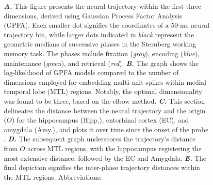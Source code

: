 \documentclass[final,3p,times,twocolumn]{elsarticle}
\begin{document}
\begin{figure}[ht]
{\textbf{\textit{A.}} This figure presents the neural trajectory within the first three dimensions, derived using Gaussian Process Factor Analysis (GPFA). Each smaller dot signifies the coordinates of a 50-ms neural trajectory bin, while larger dots indicated in \textit{black} represent the geometric medians of successive phases in the Sternberg working memory task. The phases include fixation (\textit{gray}), encoding (\textit{blue}), maintenance (\textit{green}), and retrieval (\textit{red})\cite{yu_gaussian-process_2009}. \textbf{\textit{B.}} The graph shows the log-likelihood of GPFA models compared to the number of dimensions employed for embedding multi-unit spikes within medial temporal lobe (MTL) regions. Notably, the optimal dimensionality was found to be three, based on the elbow method\cite{virtanen_scipy_2020}. \textbf{\textit{C.}} This section delineates the distance between the neural trajectory and the origin ($O$) for the hippocampus (Hipp.), entorhinal cortex (EC), and amygdala (Amy.), and plots it over time since the onset of the probe \cite{boran_dataset_2020}. \textbf{\textit{D.}} The subsequent graph underscores the trajectory's distance from $O$ across MTL regions, with the hippocampus registering the most extensive distance, followed by the EC and Amygdala\cite{fernandez-ruiz_long-duration_2019}. \textbf{\textit{E.}} The final depiction signifies the inter-phase trajectory distances within the MTL regions\cite{liu_consensus_2022}.
Abbreviations:
}
        	\label{fig:02}
        \end{figure}
        \clearpage
\end{document}
